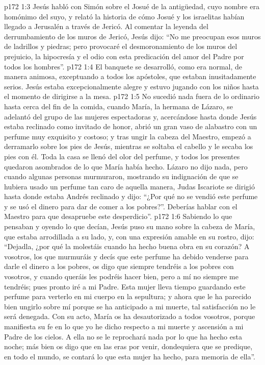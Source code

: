 \vs p172 1:3 Jesús habló con Simón sobre el Josué de la antigüedad, cuyo nombre era homónimo del suyo, y relató la historia de cómo Josué y los israelitas habían llegado a Jerusalén a través de Jericó. Al comentar la leyenda del derrumbamiento de los muros de Jericó, Jesús dijo: “No me preocupan esos muros de ladrillos y piedras; pero provocaré el desmoronamiento de los muros del prejuicio, la hipocresía y el odio con esta predicación del amor del Padre por todos los hombres”.
\vs p172 1:4 El banquete se desarrolló, como era normal, de manera animosa, exceptuando a todos los apóstoles, que estaban inusitadamente serios. Jesús estaba excepcionalmente alegre y estuvo jugando con los niños hasta el momento de dirigirse a la mesa.
\vs p172 1:5 \pc No sucedió nada fuera de lo ordinario hasta cerca del fin de la comida, cuando María, la hermana de Lázaro, se adelantó del grupo de las mujeres espectadoras y, acercándose hasta donde Jesús estaba reclinado como invitado de honor, abrió un gran vaso de alabastro con un perfume muy exquisito y costoso; y tras ungir la cabeza del Maestro, empezó a derramarlo sobre los pies de Jesús, mientras se soltaba el cabello y le secaba los pies con él. Toda la casa se llenó del olor del perfume, y todos los presentes quedaron asombrados de lo que María había hecho. Lázaro no dijo nada, pero cuando algunas personas murmuraron, mostrando su indignación de que se hubiera usado un perfume tan caro de aquella manera, Judas Iscariote se dirigió hasta donde estaba Andrés reclinado y dijo: “¿Por qué no se vendió este perfume y se usó el dinero para dar de comer a los pobres?”. Deberías hablar con el Maestro para que desapruebe este desperdicio”.
\vs p172 1:6 Sabiendo lo que pensaban y oyendo lo que decían, Jesús puso su mano sobre la cabeza de María, que estaba arrodillada a su lado, y, con una expresión amable en su rostro, dijo: “Dejadla, ¿por qué la molestáis cuando ha hecho buena obra en su corazón? A vosotros, los que murmuráis y decís que este perfume ha debido venderse para darle el dinero a los pobres, os digo que siempre tendréis a los pobres con vosotros, y cuando queráis les podréis hacer bien, pero a mí no siempre me tendréis; pues pronto iré a mi Padre. Esta mujer lleva tiempo guardando este perfume para verterlo en mi cuerpo en la sepultura; y ahora que le ha parecido bien ungirlo sobre mí porque se ha anticipado a mi muerte, tal satisfacción no le será denegada. Con su acto, María os ha desautorizado a todos vosotros, porque manifiesta su fe en lo que yo he dicho respecto a mi muerte y ascensión a mi Padre de los cielos. A ella no se le reprochará nada por lo que ha hecho esta noche; más bien os digo que en las eras por venir, dondequiera que se predique, en todo el mundo, se contará lo que esta mujer ha hecho, para memoria de ella”.
